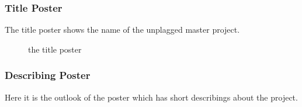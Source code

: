 \subsubsection{Title Poster}
The title poster shows the name of the unplagged master project.

\begin{figure}[!h]
  \centering
  \caption{the title poster}
  \label{fig:poster_title}
\end{figure}

\pagebreak

\subsubsection{Describing Poster}

Here it is the outlook of the poster which has short describings about the project.


